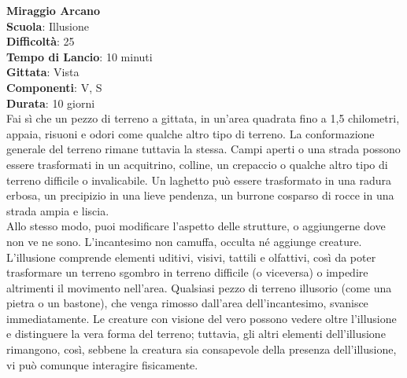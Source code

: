 \begin{multicols}{2}
\medskip\textbf{Miraggio Arcano}\\
\textbf{Scuola}: Illusione\\
\textbf{Difficoltà}: 25\\
\textbf{Tempo di Lancio}: 10 minuti\\
\textbf{Gittata}: Vista\\
\textbf{Componenti}: V, S\\
\textbf{Durata}: 10 giorni\\
Fai sì che un pezzo di terreno a gittata, in un'area quadrata fino a 1,5 chilometri, appaia, risuoni e odori come qualche altro tipo di terreno. La conformazione generale del terreno rimane tuttavia la stessa. Campi aperti o una strada possono essere trasformati in un acquitrino, colline, un crepaccio o qualche altro tipo di terreno difficile o invalicabile. Un laghetto può essere trasformato in una radura erbosa, un precipizio in una lieve pendenza, un burrone cosparso di rocce in una strada ampia e liscia.\\
Allo stesso modo, puoi modificare l'aspetto delle strutture, o aggiungerne dove non ve ne sono. L'incantesimo non camuffa, occulta né aggiunge creature.\\
L'illusione comprende elementi uditivi, visivi, tattili e olfattivi, così da poter trasformare un terreno sgombro in terreno difficile (o viceversa) o impedire altrimenti il movimento nell'area. Qualsiasi pezzo di terreno illusorio (come una pietra o un bastone), che venga rimosso dall'area dell'incantesimo, svanisce immediatamente. Le creature con visione del vero possono vedere oltre l'illusione e distinguere la vera forma del terreno; tuttavia, gli altri elementi dell'illusione rimangono, così, sebbene la creatura sia consapevole della presenza dell'illusione, vi può comunque interagire fisicamente. 


\end{multicols}
